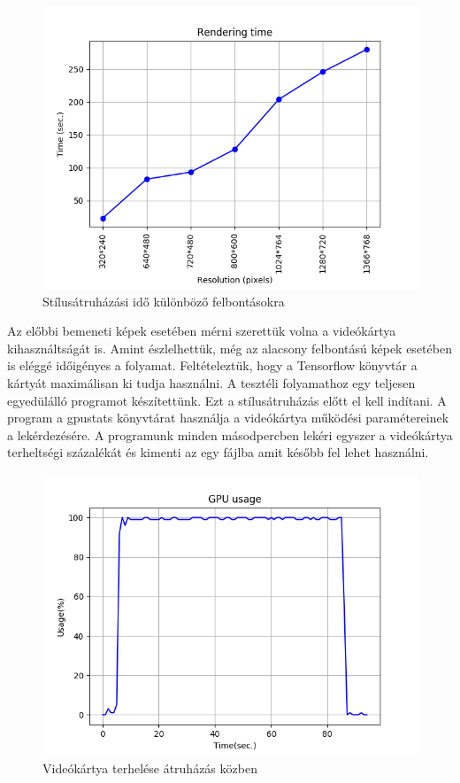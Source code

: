 \documentclass[12pt, a4paper, oneside]{book}
\theoremstyle{tetel}
\begin{document}
\begin{figure}[!htbp]
	\begin{center}
		\includegraphics[scale=0.8]{time_per_res.png}
		\caption{Stílusátruházási idő különböző felbontásokra}
		\label{time_per_res}
	\end{center}
\end{figure}

Az előbbi bemeneti képek esetében mérni szerettük volna a videókártya kihasználtságát is. Amint észlelhettük, még az alacsony felbontású képek esetében is eléggé időigényes a folyamat. Feltételeztük, hogy a Tensorflow könyvtár a kártyát maximálisan ki tudja használni. A tesztéli folyamathoz egy teljesen egyedülálló programot készítettünk. Ezt a stílusátruházás előtt el kell indítani. A program a gpustats\cite{36} könyvtárat használja a videókártya működési paramétereinek a lekérdezésére. A programunk minden másodpercben lekéri egyszer a videókártya terheltségi százalékát és kimenti az egy fájlba amit később fel lehet használni.

\begin{figure}[!htbp]
	\begin{center}
		\includegraphics[scale=0.8]{gpu_usage.png}
		\caption{Videókártya terhelése átruházás közben}
		\label{gpu_usage}
	\end{center}
\end{figure}
\end{document}
